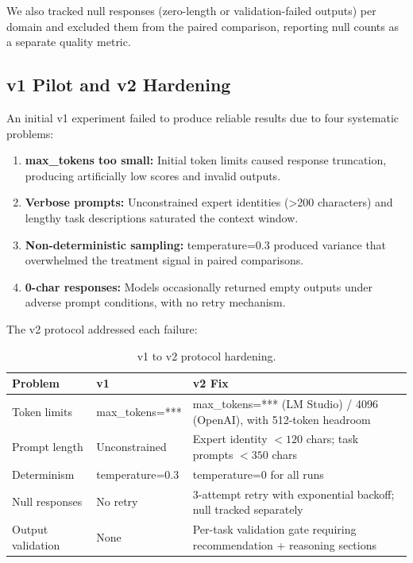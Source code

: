 \documentclass[anonymous, submission, paper]{iclr2026}
\begin{document}
We also tracked null responses (zero-length or validation-failed outputs) per domain and excluded them from the paired comparison, reporting null counts as a separate quality metric.

\subsection{v1 Pilot and v2 Hardening}
\label{sec:pilot_hardening}

An initial v1 experiment failed to produce reliable results due to four systematic problems:

\begin{enumerate}
  \item \textbf{max_tokens too small:} Initial token limits caused response truncation, producing artificially low scores and invalid outputs.
  \item \textbf{Verbose prompts:} Unconstrained expert identities (>200 characters) and lengthy task descriptions saturated the context window.
  \item \textbf{Non-deterministic sampling:} temperature=0.3 produced variance that overwhelmed the treatment signal in paired comparisons.
  \item \textbf{0-char responses:} Models occasionally returned empty outputs under adverse prompt conditions, with no retry mechanism.
\end{enumerate}

The v2 protocol addressed each failure:

\begin{table}[htbp]
  \centering
  \caption{v1 to v2 protocol hardening.}
  \begin{tabular}{@{}lll@{}}
    \toprule
    \textbf{Problem} & \textbf{v1} & \textbf{v2 Fix} \\
    \midrule
    Token limits & max_tokens=*** & max_tokens=*** (LM Studio) / 4096 (OpenAI), with 512-token headroom \\
    Prompt length & Unconstrained & Expert identity $<120$ chars; task prompts $<350$ chars \\
    Determinism & temperature=0.3 & temperature=0 for all runs \\
    Null responses & No retry & 3-attempt retry with exponential backoff; null tracked separately \\
    Output validation & None & Per-task validation gate requiring recommendation + reasoning sections \\
    \bottomrule
  \end{tabular}
  \label{tab:v1_v2_hardening}
\end{table}
\end{document}

